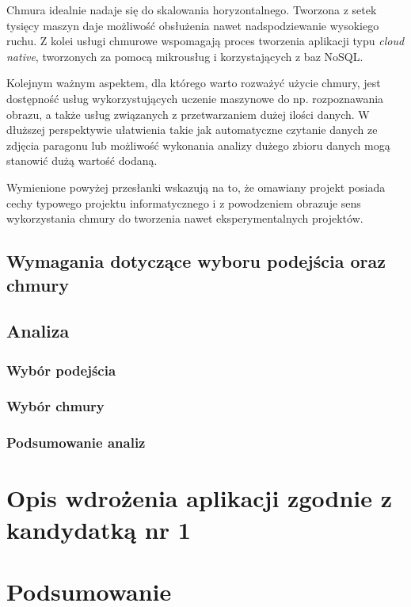 \documentclass[12pt,a4paper,twoside,titlepage,openright]{book}
\begin{document}
Chmura idealnie nadaje się do skalowania horyzontalnego. Tworzona z setek tysięcy maszyn daje możliwość obsłużenia nawet nadspodziewanie wysokiego ruchu. Z kolei usługi chmurowe wspomagają proces tworzenia aplikacji typu \textit{cloud native}, tworzonych za pomocą mikrousług i korzystających z baz NoSQL.

Kolejnym ważnym aspektem, dla którego warto rozważyć użycie chmury, jest dostępność usług wykorzystujących uczenie maszynowe do np. rozpoznawania obrazu, a także usług związanych z przetwarzaniem dużej ilości danych. W dłuższej perspektywie ułatwienia takie jak automatyczne czytanie danych ze zdjęcia paragonu lub możliwość wykonania analizy dużego zbioru danych mogą stanowić dużą wartość dodaną.

Wymienione powyżej przesłanki wskazują na to, że omawiany projekt posiada cechy typowego projektu informatycznego i z powodzeniem obrazuje sens wykorzystania chmury do tworzenia nawet eksperymentalnych projektów.

\section{Wymagania dotyczące wyboru podejścia oraz chmury}



\section{Analiza}

\subsection{Wybór podejścia}

\subsection{Wybór chmury}

\subsection{Podsumowanie analiz}





\chapter{Opis wdrożenia aplikacji zgodnie z kandydatką nr 1 }
 
\chapter*{Podsumowanie}
 
 
 
 
\listoffigures

\listoftables



\printbibliography
 
\end{document}
